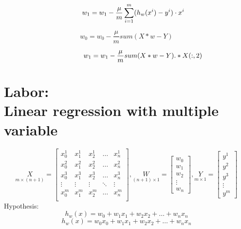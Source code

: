 \documentclass[12pt]{article}
\begin{document}
\begin{equation}
\hspace{7mm} w_1=w_1-\frac{\mu}{m}\sum_{i=1}^{m}(h_w(x^{i})-y^{i}) \cdot x^i
\end{equation}

{\color{red}
\begin{equation}
w_0=w_0-\frac{\mu}{m}sum(X*w-Y)
\end{equation}

\begin{equation}
\hspace{17mm} w_1=w_1-\frac{\mu}{m}sum(X*w-Y).*X(:,2)
\end{equation}
}
\newpage
\section{Labor:\\ \large Linear regression with multiple variable}
\begin{equation}
\underset{m\times (n+1)}{X}=\left[
\begin{matrix}
	x_{0}^{1} & x_{1}^{1} & x_{2}^{1} & \hdots & x_{n}^{1} \\
	x_{0}^{2} & x_{1}^{2} & x_{2}^{2} & \hdots & x_{n}^{2} \\
	x_{0}^{3} & x_{1}^{3} & x_{2}^{3} & \hdots & x_{n}^{3} \\
	\vdots    & \vdots    & \vdots    & \ddots & \vdots    \\
	x_{0}^{m} & x_{1}^{m} & x_{2}^{m} & \hdots & x_{n}^{m} \\
\end{matrix} \right], 
\underset{(n+1)\times 1}{W}=\left[
\begin{matrix}
	w_{0}\\
	w_{1}\\
	w_{2}\\
	\vdots\\
	w_{n}
\end{matrix} \right],
\underset{m\times 1}{Y}=\left[
\begin{matrix}
	y^{1}\\
	y^{2}\\
	y^{3}\\
	\vdots\\
	y^{m}
\end{matrix} \right]
\end{equation}
Hypothesis:
\begin{equation}
h_{w}(x)=w_0+w_1x_1+w_2x_2+\hdots+w_nx_n
\end{equation}
\begin{equation}
\label{eq:proba} 
h_{w}(x)=w_0x_0+w_1x_1+w_2x_2+\hdots+w_nx_n
\end{equation}
\end{document}
